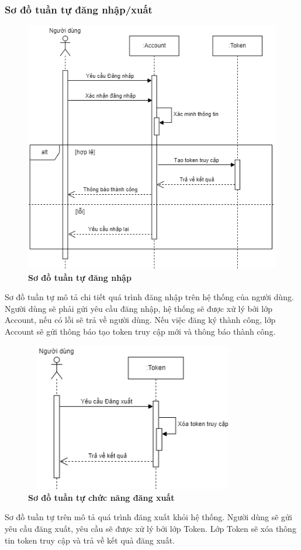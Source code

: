 \subsubsection{Sơ đồ tuần tự đăng nhập/xuất}
\begin{figure}[H]
  \centering
  \includegraphics[width=12cm,height=11cm]{Images/sequence/sequence_login.png}
  \caption[Sơ đồ tuần tự đăng nhập]{\bfseries \fontsize{12pt}{0pt}
  \selectfont Sơ đồ tuần tự đăng nhập}
  \label{sequence_login} %
\end{figure}
Sơ đồ tuần tự mô tả chi tiết quá trình đăng nhập trên hệ thống của người dùng. Người dùng sẽ phải gửi yêu cầu đăng nhập, hệ thống sẽ được xử lý
bởi lớp Account, nếu có lỗi sẽ trả về người dùng. Nếu việc đăng ký thành công, lớp Account sẽ gửi thông báo 
tạo token truy cập mới và thông báo thành công. 
\begin{figure}[H]
  \centering
  \includegraphics[width=9.5cm,height=6.5cm]{Images/sequence/sequence_logout.png}
  \caption[Sơ đồ tuần tự chức năng đăng xuất]{\bfseries \fontsize{12pt}{0pt}
  \selectfont Sơ đồ tuần tự chức năng đăng xuất}
  \label{sequence_logout} %
\end{figure}
Sơ đồ tuần tự trên mô tả quá trình đăng xuất khỏi hệ thống. Người dùng sẽ gửi yêu cầu đăng xuất, yêu cầu sẽ được xử lý
bởi lớp Token. Lớp Token sẽ xóa thông tin token truy cập và trả về kết quả đăng xuất.

